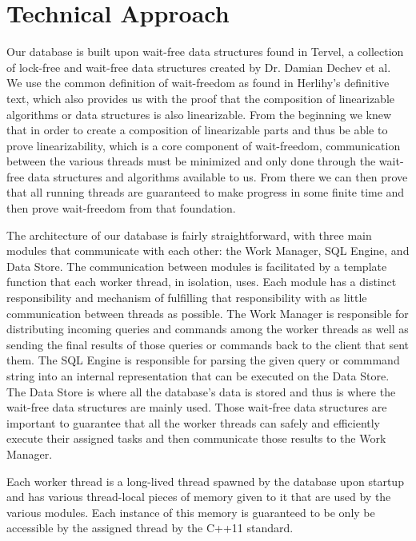 \documentclass[letter,11pt]{article}
\begin{document}
\section{Technical Approach}
Our database is built upon wait-free data structures found in Tervel, a collection of
lock-free and wait-free data structures created by Dr. Damian Dechev et al\cite{web:tervel}. We use
the common definition of wait-freedom as found in Herlihy's definitive text\cite{herlihy:waitfree}, which
also provides us with the proof that the composition of linearizable algorithms or data structures
is also linearizable. From the beginning we knew that in order to create a
composition of linearizable parts and thus be able to prove linearizability, which is a core component of
wait-freedom, communication between the various threads must be minimized and only
done through the wait-free data structures and algorithms available to us. From there
we can then prove that all running threads are guaranteed to make progress in some finite time
and then prove wait-freedom from that foundation.
\par\vspace{\baselineskip}
The architecture of our database is fairly straightforward, with three main modules that 
communicate with each other: the Work Manager, SQL Engine, and Data Store. The communication
between modules is facilitated by a template function that each worker thread, in isolation, uses.
Each module has a distinct responsibility and mechanism of fulfilling that responsibility with as 
little communication between threads as possible. The Work Manager is responsible for distributing
incoming queries and commands among the worker threads as well as sending the final results of those
queries or commands back to the client that sent them. The SQL Engine is responsible for parsing the
given query or commmand string into an internal representation that can be executed on the Data Store.
The Data Store is where all the database's data is stored and thus is where the wait-free data
structures are mainly used. Those wait-free data structures are important to guarantee that all
the worker threads can safely and efficiently execute their assigned tasks and then communicate
those results to the Work Manager.
\par\vspace{\baselineskip}
Each worker thread is a long-lived thread spawned by the database upon startup and has various
thread-local pieces of memory given to it that are used by the various modules. Each instance of
this memory is guaranteed to be only be accessible by the assigned thread by the C++11 standard\cite{std:c++11}.
\end{document}
